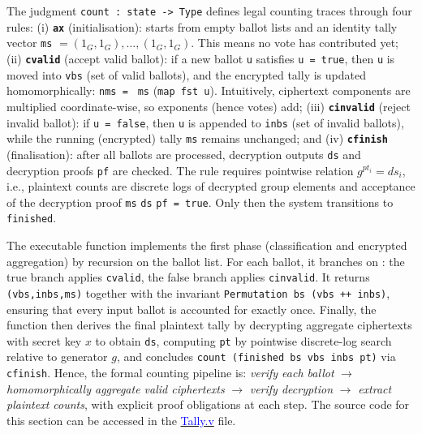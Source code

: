 \documentclass[sigconf, anonymous]{acmart}
\begin{document}
The judgment \texttt{count : state -> Type} defines legal counting traces through four rules: 
(i) \textbf{\texttt{ax}} (initialisation): starts from empty ballot lists and an identity tally vector \texttt{ms} $= (1_G,1_G),\ldots,(1_G,1_G)$. This means no vote has contributed yet; 
(ii) \textbf{\texttt{cvalid}} (accept valid ballot): if a new ballot \texttt{u} satisfies \texttt{} \texttt{u = true}, then \texttt{u} is moved into \texttt{vbs} (set of valid ballots), and the encrypted tally is updated homomorphically: \texttt{nms = } \texttt{ms} (\texttt{map fst u}). Intuitively, ciphertext components are multiplied coordinate-wise, so exponents (hence votes) add; 
(iii) \textbf{\texttt{cinvalid}} (reject invalid ballot): if \texttt{} \texttt{u = false}, then \texttt{u} is appended to \texttt{inbs} (set of invalid ballots), while the running (encrypted) tally \texttt{ms} remains unchanged; and 
(iv) \textbf{\texttt{cfinish}} (finalisation): after all ballots are processed, decryption outputs \texttt{ds} and decryption proofs \texttt{pf} are checked. The rule requires pointwise relation $g^{pt_i}=ds_i$, i.e., plaintext counts are discrete logs of decrypted group elements and acceptance of the decryption proof \texttt{} \texttt{ms} \texttt{ds} \texttt{pf = true}. Only then the system transitions to \texttt{finished}.

The executable function \texttt{} implements the first phase (classification and encrypted aggregation) by recursion on the ballot list. For each ballot, it branches on \texttt{}: the true branch applies \texttt{cvalid}, the false branch applies \texttt{cinvalid}. It returns \texttt{(vbs,inbs,ms)} together with the invariant \texttt{Permutation bs (vbs ++ inbs)}, ensuring that every input ballot is accounted for exactly once. Finally, the function \texttt{} then derives the final plaintext tally by decrypting aggregate ciphertexts with secret key $x$ to obtain \texttt{ds}, computing \texttt{pt} by pointwise discrete-log search relative to generator $g$, and concludes \texttt{count (finished bs vbs inbs pt)} via \texttt{cfinish}. Hence, the formal counting pipeline is: \emph{verify each ballot} $\to$ \emph{homomorphically aggregate valid ciphertexts} $\to$ \emph{verify decryption} $\to$ \emph{extract plaintext counts}, with explicit proof obligations at each step. The source code for this section can be accessed in the \href{https://anonymous.4open.science/r/SigmaProtocol-EBA5/src/Backend/Tally.v}{\textcolor{blue}{Tally.v}} file.
\end{document}
